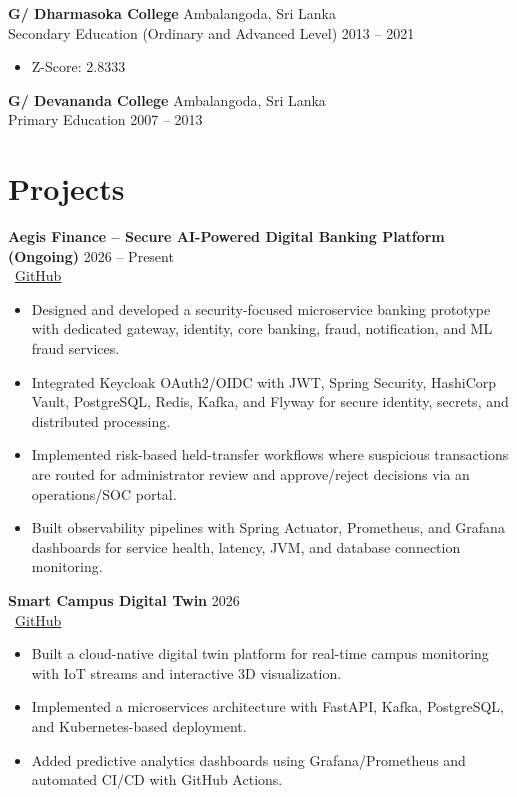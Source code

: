\documentclass[a4paper,11pt]{article}
\begin{document}
\textbf{G/ Dharmasoka College} \hfill Ambalangoda, Sri Lanka \\
Secondary Education (Ordinary and Advanced Level) \hfill 2013 -- 2021
\begin{itemize}
    \item Z-Score: 2.8333
\end{itemize}

\textbf{G/ Devananda College} \hfill Ambalangoda, Sri Lanka \\
Primary Education \hfill 2007 -- 2013

\section*{Projects}
\textbf{Aegis Finance -- Secure AI-Powered Digital Banking Platform (Ongoing)} \hfill 2026 -- Present
\\ \faGithub\ \href{https://github.com/lakaThabrew/aegis-Finance}{GitHub}
\begin{itemize}
    \item Designed and developed a security-focused microservice banking prototype with dedicated gateway, identity, core banking, fraud, notification, and ML fraud services.
    \item Integrated Keycloak OAuth2/OIDC with JWT, Spring Security, HashiCorp Vault, PostgreSQL, Redis, Kafka, and Flyway for secure identity, secrets, and distributed processing.
    \item Implemented risk-based held-transfer workflows where suspicious transactions are routed for administrator review and approve/reject decisions via an operations/SOC portal.
    \item Built observability pipelines with Spring Actuator, Prometheus, and Grafana dashboards for service health, latency, JVM, and database connection monitoring.
\end{itemize}

\textbf{Smart Campus Digital Twin} \hfill 2026
\\ \faGithub\ \href{https://github.com/lakaThabrew/Smart-Campus-Digital-Twin-v4}{GitHub}
\begin{itemize}
    \item Built a cloud-native digital twin platform for real-time campus monitoring with IoT streams and interactive 3D visualization.
    \item Implemented a microservices architecture with FastAPI, Kafka, PostgreSQL, and Kubernetes-based deployment.
    \item Added predictive analytics dashboards using Grafana/Prometheus and automated CI/CD with GitHub Actions.
\end{itemize}
\end{document}
